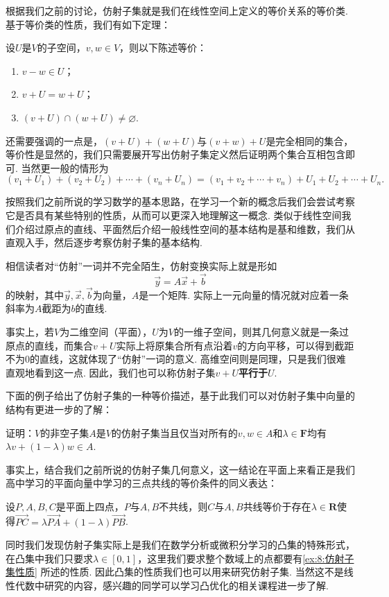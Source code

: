 根据我们之前的讨论，仿射子集就是我们在线性空间上定义的等价关系的等价类. 基于等价类的性质，我们有如下定理：
\begin{theorem}
    设$U$是$V$的子空间，$v,w\in V$，则以下陈述等价：
    \begin{enumerate}
        \item $v-w\in U$；

        \item $v+U=w+U$；

        \item $(v+U)\cap(w+U)\neq \varnothing$.
    \end{enumerate}
\end{theorem}

还需要强调的一点是，$(v+U)+(w+U)$与$(v+w)+U$是完全相同的集合，等价性是显然的，我们只需要展开写出仿射子集定义然后证明两个集合互相包含即可. 当然更一般的情形为
\[(v_1+U_1)+(v_2+U_2)+\cdots+(v_n+U_n)=(v_1+v_2+\cdots+v_n)+U_1+U_2+\cdots+U_n.\]

按照我们之前所说的学习数学的基本思路，在学习一个新的概念后我们会尝试考察它是否具有某些特别的性质，从而可以更深入地理解这一概念. 类似于线性空间我们介绍过原点的直线、平面然后介绍一般线性空间的基本结构是基和维数，我们从直观入手，然后逐步考察仿射子集的基本结构.

相信读者对``仿射''一词并不完全陌生，仿射变换实际上就是形如\[\vec{y}=A\vec{x}+\vec{b}\]的映射，其中$\vec{y},\vec{x},\vec{b}$为向量，$A$是一个矩阵. 实际上一元向量的情况就对应着一条斜率为$A$截距为$b$的直线.

事实上，若$V$为二维空间（平面），$U$为$V$的一维子空间，则其几何意义就是一条过原点的直线，而集合$v+U$实际上将原集合所有点沿着$v$的方向平移，可以得到截距不为0的直线，这就体现了``仿射''一词的意义. 高维空间则是同理，只是我们很难直观地看到这一点. 因此，我们也可以称仿射子集$v+U$\textbf{\heiti 平行于}$U$.

下面的例子给出了仿射子集的一种等价描述，基于此我们可以对仿射子集中向量的结构有更进一步的了解：
\begin{example}\label{ex:8:仿射子集性质}
    证明：$V$的非空子集$A$是$V$的仿射子集当且仅当对所有的$v,w\in A$和$\lambda\in\mathbf{F}$均有$\lambda v+(1-\lambda)w\in A$.
\end{example}

\begin{solution}

\end{solution}

事实上，结合我们之前所说的仿射子集几何意义，这一结论在平面上来看正是我们高中学习的平面向量中学习的三点共线的等价条件的同义表达：
\begin{theorem}
    设$P,A,B,C$是平面上四点，$P$与$A,B$不共线，则$C$与$A,B$共线等价于存在$\lambda\in\mathbf{R}$使得$\overrightarrow{PC}=\lambda\overrightarrow{PA}+(1-\lambda)\overrightarrow{PB}$.
\end{theorem}
同时我们发现仿射子集实际上是我们在数学分析或微积分学习的凸集的特殊形式，在凸集中我们只要求$\lambda\in[0,1]$，这里我们要求整个数域上的点都要有\autoref{ex:8:仿射子集性质} 所述的性质. 因此凸集的性质我们也可以用来研究仿射子集. 当然这不是线性代数中研究的内容，感兴趣的同学可以学习凸优化的相关课程进一步了解.

